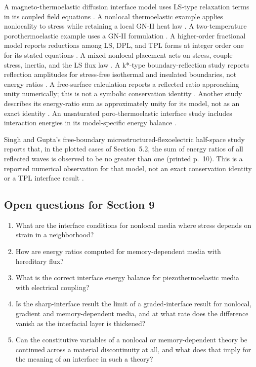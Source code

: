 A magneto-thermoelastic diffusion interface model uses LS-type relaxation terms in its coupled field equations \cite{KumarKansal2017}. A nonlocal thermoelastic example applies nonlocality to stress while retaining a local GN-II heat law \cite{Sarkar2019}. A two-temperature porothermoelastic example uses a GN-II formulation \cite{Singh2020}. A higher-order fractional model reports reductions among LS, DPL, and TPL forms at integer order one for its stated equations \cite{Aldandani2026}. A mixed nonlocal placement acts on stress, couple stress, inertia, and the LS flux law \cite{Kalkal2020}. A k*-type boundary-reflection study reports reflection amplitudes for stress-free isothermal and insulated boundaries, not energy ratios \cite{Das2008}. A free-surface calculation reports a reflected ratio approaching unity numerically; this is not a symbolic conservation identity \cite{Singh2020b}. Another study describes its energy-ratio sum as approximately unity for its model, not as an exact identity \cite{Kumar2019}. An unsaturated poro-thermoelastic interface study includes interaction energies in its model-specific energy balance \cite{Kumar2022}.

Singh and Gupta's free-boundary microstructured-flexoelectric half-space study reports that, in the plotted cases of Section~5.2, the sum of energy ratios of all reflected waves is observed to be no greater than one (printed p.~10). This is a reported numerical observation for that model, not an exact conservation identity or a TPL interface result \cite{Singh2020c}.

\subsection{Open questions for Section 9}

\begin{enumerate}[label=\textbf{OQ9.\arabic*}]
\item What are the interface conditions for nonlocal media where stress depends on strain in a neighborhood? \\ \label{oq:9.1}
\item How are energy ratios computed for memory-dependent media with hereditary flux? \\ \label{oq:9.2}
\item What is the correct interface energy balance for piezothermoelastic media with electrical coupling? \\ \label{oq:9.3}
\item Is the sharp-interface result the limit of a graded-interface result for nonlocal, gradient and memory-dependent media, and at what rate does the difference vanish as the interfacial layer is thickened? \\ \label{oq:9.4}
\item Can the constitutive variables of a nonlocal or memory-dependent theory be continued across a material discontinuity at all, and what does that imply for the meaning of an interface in such a theory? \\ \label{oq:9.5}
\end{enumerate}

